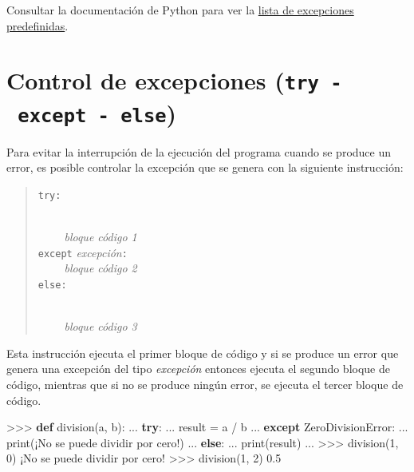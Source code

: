\documentclass[
  spanish,
  a4paper,
]{scrreport}
\newenvironment{Shaded}{\begin{snugshade}}{\end{snugshade}}
\newcommand{\BuiltInTok}[1]{\textcolor[rgb]{0.00,0.23,0.31}{#1}}
\newcommand{\ControlFlowTok}[1]{\textcolor[rgb]{0.00,0.23,0.31}{\textbf{#1}}}
\newcommand{\DecValTok}[1]{\textcolor[rgb]{0.68,0.00,0.00}{#1}}
\newcommand{\FloatTok}[1]{\textcolor[rgb]{0.68,0.00,0.00}{#1}}
\newcommand{\KeywordTok}[1]{\textcolor[rgb]{0.00,0.23,0.31}{\textbf{#1}}}
\newcommand{\NormalTok}[1]{\textcolor[rgb]{0.00,0.23,0.31}{#1}}
\newcommand{\OperatorTok}[1]{\textcolor[rgb]{0.37,0.37,0.37}{#1}}
\newcommand{\PreprocessorTok}[1]{\textcolor[rgb]{0.68,0.00,0.00}{#1}}
\newcommand{\StringTok}[1]{\textcolor[rgb]{0.13,0.47,0.30}{#1}}
\begin{document}
Consultar la documentación de Python para ver la
\href{https://docs.python.org/3/library/exceptions.html}{lista de
excepciones predefinidas}.

\section{\texorpdfstring{Control de excepciones
(\texttt{try\ -\ except\ -\ else})}{Control de excepciones (try - except - else)}}\label{control-de-excepciones-try---except---else}

Para evitar la interrupción de la ejecución del programa cuando se
produce un error, es posible controlar la excepción que se genera con la
siguiente instrucción:

\begin{quote}
\texttt{try:}\strut \\
     \emph{bloque código 1}\\
\texttt{except} \emph{excepción}\texttt{:}\\
     \emph{bloque código 2}\\
\texttt{else:}\strut \\
     \emph{bloque código 3}
\end{quote}

Esta instrucción ejecuta el primer bloque de código y si se produce un
error que genera una excepción del tipo \emph{excepción} entonces
ejecuta el segundo bloque de código, mientras que si no se produce
ningún error, se ejecuta el tercer bloque de código.

\begin{Shaded}
\begin{Highlighting}[]
\OperatorTok{\textgreater{}\textgreater{}\textgreater{}} \KeywordTok{def}\NormalTok{ division(a, b):}
\NormalTok{...     }\ControlFlowTok{try}\NormalTok{:}
\NormalTok{...         result }\OperatorTok{=}\NormalTok{ a }\OperatorTok{/}\NormalTok{ b}
\NormalTok{...     }\ControlFlowTok{except} \PreprocessorTok{ZeroDivisionError}\NormalTok{:}
\NormalTok{...         }\BuiltInTok{print}\NormalTok{(}\StringTok{\textquotesingle{}¡No se puede dividir por cero!\textquotesingle{}}\NormalTok{)}
\NormalTok{...     }\ControlFlowTok{else}\NormalTok{:}
\NormalTok{...         }\BuiltInTok{print}\NormalTok{(result)}
\NormalTok{...}
\OperatorTok{\textgreater{}\textgreater{}\textgreater{}}\NormalTok{ division(}\DecValTok{1}\NormalTok{, }\DecValTok{0}\NormalTok{)}
\NormalTok{¡No se puede dividir por cero}\OperatorTok{!}
\OperatorTok{\textgreater{}\textgreater{}\textgreater{}}\NormalTok{ division(}\DecValTok{1}\NormalTok{, }\DecValTok{2}\NormalTok{)}
\FloatTok{0.5}
\end{Highlighting}
\end{Shaded}
\end{document}
